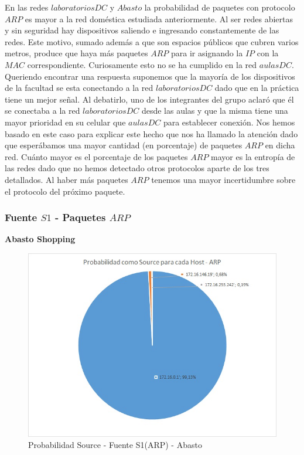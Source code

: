 En las redes $laboratoriosDC$ y $Abasto$ la probabilidad de paquetes con protocolo $ARP$ es mayor a la red doméstica estudiada anteriormente. 
Al ser redes abiertas y sin seguridad hay dispositivos saliendo e ingresando constantemente de las redes. Este motivo, sumado además a que 
son espacios públicos que cubren varios metros, produce que haya más paquetes $ARP$ para ir asignando la $IP$ con la $MAC$ correspondiente.
Curiosamente esto no se ha cumplido en la red $aulasDC$. Queriendo encontrar una respuesta suponemos que la mayoría de los dispositivos de la facultad
se esta conectando a la red $laboratoriosDC$ dado que en la práctica tiene un mejor señal. Al debatirlo, uno de los integrantes del grupo aclaró que
él se conectaba a la red $laboratoriosDC$ desde las aulas y que la misma tiene una mayor prioridad en su celular que $aulasDC$ para establecer 
conexión. Nos hemos basado en este caso para explicar este hecho que nos ha llamado la atención dado que esperábamos una mayor cantidad 
(en porcentaje) de paquetes $ARP$ en dicha red. Cuánto mayor es el porcentaje de los paquetes $ARP$ mayor es la entropía de las redes dado que 
no hemos detectado otros protocolos aparte de los tres detallados. Al haber más paquetes $ARP$ tenemos una mayor incertidumbre sobre el protocolo
del próximo paquete.\\

\newpage
\subsubsection{Fuente $S1$ - Paquetes $ARP$}

\textbf{Abasto Shopping}
\begin{figure}[h!]
\centering
\includegraphics[scale=0.6]{./img/proba_src_abasto.jpg}
\caption{Probabilidad Source - Fuente S1(ARP) - Abasto}
\end{figure}

